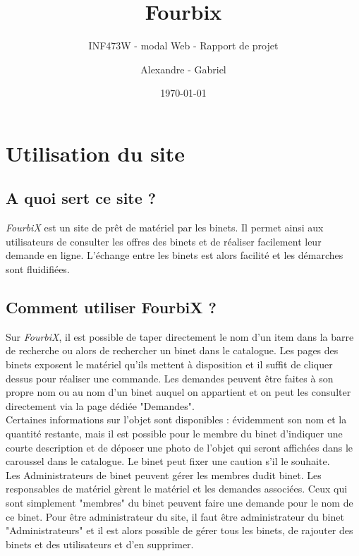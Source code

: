 \documentclass[titlepage,11pt,a4paper]{article}
\title{Fourbix}
\subtitle{INF473W - modal Web - Rapport de projet}
\author{Alexandre \bsc{Binninger} - Gabriel \bsc{Oliveira Martins}}
\date{\today}
\begin{document}
\maketitle

\clearpage

\setcounter{page}{1}

\section{Utilisation du site}

\subsection{A quoi sert ce site ?}

\emph{FourbiX} est un site de prêt de matériel par les binets. Il permet ainsi aux utilisateurs de consulter les offres des binets et de réaliser facilement leur demande en ligne. L'échange entre les binets est alors facilité et les démarches sont fluidifiées.


\subsection{Comment utiliser FourbiX ?}

Sur \emph{FourbiX}, il est possible de taper directement le nom d'un item dans la barre de recherche ou alors de rechercher un binet dans le catalogue. Les pages des binets exposent le matériel qu'ils mettent à disposition et il suffit de cliquer dessus pour réaliser une commande. Les demandes peuvent être faites à son propre nom ou au nom d'un binet auquel on appartient et on peut les consulter directement via la page dédiée "Demandes".\\

Certaines informations sur l'objet sont disponibles : évidemment son nom et la quantité restante, mais il est possible pour le membre du binet d'indiquer une courte description et de déposer une photo de l'objet qui seront affichées dans le caroussel dans le catalogue. Le binet peut fixer une caution s'il le souhaite.\\

Les Administrateurs de binet peuvent gérer les membres dudit binet. Les responsables de matériel gèrent le matériel et les demandes associées. Ceux qui sont simplement "membres" du binet peuvent faire une demande pour le nom de ce binet. Pour être administrateur du site, il faut être administrateur du binet "Administrateurs" et il est alors possible de gérer tous les binets, de rajouter des binets et des utilisateurs et d'en supprimer.\\
\end{document}
